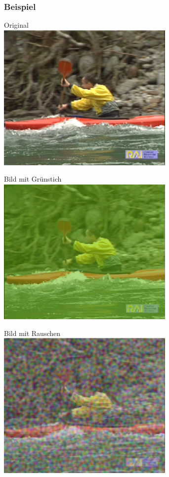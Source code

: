 \documentclass[t]{beamer}
\begin{document}
\begin{frame}
	\frametitle{Beispiel}

	\begin{center}
		Original ~\\
		\includegraphics[scale=.45]{rafting-original.png}	
	\end{center}
	\begin{minipage}{5cm}
		\begin{center}
			Bild mit Grünstich ~\\
			\includegraphics[scale=.45]{rafting-green.png}		
		\end{center}	
	\end{minipage}
	\hfill
	\begin{minipage}{5cm}
		\begin{center}
			Bild mit Rauschen ~\\
			\includegraphics[scale=.43]{rafting-colored-perlin.png}
		\end{center}	
	\end{minipage}
	\hfill
\end{frame}
\end{document}
